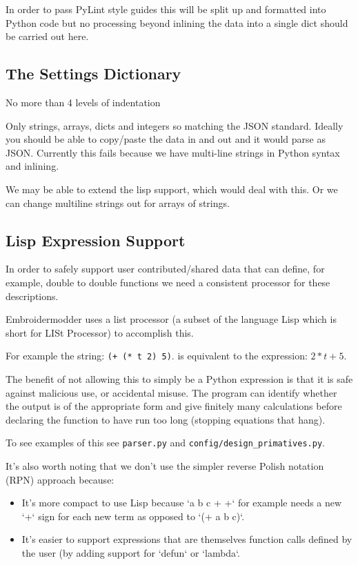 \documentclass[11pt]{report}
\begin{document}
In order to pass PyLint style guides this will be split up and
formatted into Python code but no processing beyond inlining
the data into a single dict should be carried out here.

\subsection{The Settings Dictionary}

No more than 4 levels of indentation

Only strings, arrays, dicts and integers so matching the JSON standard. Ideally you should be able to copy/paste the data in and out and it would parse as JSON. Currently this fails because we have multi-line strings in Python syntax and inlining.

We may be able to extend the lisp support, which would deal with this. Or we can change multiline strings out for arrays of strings.

\subsection{Lisp Expression Support}

In order to safely support user contributed/shared data that can
define, for example, double to double functions we need a consistent
processor for these descriptions.

Embroidermodder uses a list processor (a subset of the language
Lisp which is short for LISt Processor) to accomplish this.

For example the string: \texttt{(+ (* t 2) 5)}.
is equivalent to the expression: $2*t + 5$.

The benefit of not allowing this to simply be a Python expression
is that it is safe against malicious use, or accidental misuse.
The program can identify whether the output is of the appropriate
form and give finitely many calculations before declaring the
function to have run too long (stopping equations that hang).

To see examples of this see \texttt{parser.py} and
\texttt{config/design\_primatives.py}.

It's also worth noting that we don't use the simpler reverse Polish
notation (RPN) approach because:

\begin{itemize}
\item It's more compact to use Lisp because `a b c + +` for example needs a new `+` sign for each new term as opposed to `(+ a b c)`.
\item It's easier to support expressions that are themselves function calls defined by the user (by adding support for `defun` or `lambda`.
\end{itemize}
\end{document}
